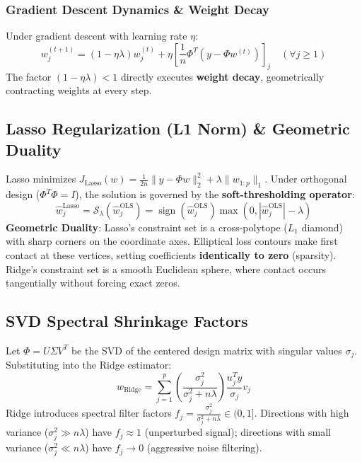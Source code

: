 \documentclass[11pt,a4paper]{article}
\theoremstyle{definition}
\theoremstyle{plain}
\theoremstyle{remark}
\DeclareMathOperator{\sign}{sign}
\begin{document}
\subsubsection{Gradient Descent Dynamics \& Weight Decay}
Under gradient descent with learning rate $\eta$:
\begin{equation}
w_j^{(t+1)} = (1 - \eta \lambda) w_j^{(t)} + \eta \left[ \frac{1}{n} \Phi^T (y - \Phi w^{(t)}) \right]_j \quad (\forall j \ge 1)
\end{equation}
The factor $(1 - \eta \lambda) < 1$ directly executes \textbf{weight decay}, geometrically contracting weights at every step.

\subsection{Lasso Regularization (L1 Norm) \& Geometric Duality}
Lasso minimizes $J_{\mathrm{Lasso}}(w) = \frac{1}{2n}\|y - \Phi w\|_2^2 + \lambda \|w_{1:p}\|_1$.
Under orthogonal design ($\Phi^T \Phi = I$), the solution is governed by the \textbf{soft-thresholding operator}:
\begin{equation}
\hat{w}_j^{\mathrm{Lasso}} = \mathcal{S}_\lambda(\hat{w}_j^{\mathrm{OLS}}) = \sign(\hat{w}_j^{\mathrm{OLS}}) \max\left(0, |\hat{w}_j^{\mathrm{OLS}}| - \lambda\right)
\end{equation}
\textbf{Geometric Duality}: Lasso's constraint set is a cross-polytope ($L_1$ diamond) with sharp corners on the coordinate axes. Elliptical loss contours make first contact at these vertices, setting coefficients \textbf{identically to zero} (sparsity). Ridge's constraint set is a smooth Euclidean sphere, where contact occurs tangentially without forcing exact zeros.

\subsection{SVD Spectral Shrinkage Factors}
Let $\Phi = U \Sigma V^T$ be the SVD of the centered design matrix with singular values $\sigma_j$.
Substituting into the Ridge estimator:
\begin{equation}
w_{\mathrm{Ridge}} = \sum_{j=1}^p \left( \frac{\sigma_j^2}{\sigma_j^2 + n\lambda} \right) \frac{u_j^T y}{\sigma_j} v_j
\end{equation}
Ridge introduces spectral filter factors $f_j = \frac{\sigma_j^2}{\sigma_j^2 + n\lambda} \in (0, 1]$. Directions with high variance ($\sigma_j^2 \gg n\lambda$) have $f_j \approx 1$ (unperturbed signal); directions with small variance ($\sigma_j^2 \ll n\lambda$) have $f_j \to 0$ (aggressive noise filtering).
\end{document}
